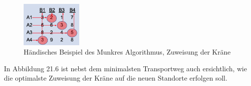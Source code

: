 \begin{figure}
\centering
\includegraphics[width=3cm]{papers/munkres/figures/Ungarische_Methode_Beispiel_Zuw.png}
\caption{Händisches Beispiel des Munkres Algorithmus, Zuweisung der Kräne }
\label{munkres:Vr2}
\end{figure} 

In Abbildung 21.6 ist nebst dem minimalsten Transportweg auch ersichtlich, wie die optimalste Zuweisung der Kräne auf die neuen Standorte erfolgen soll.